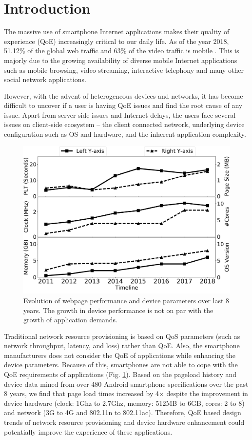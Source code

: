 \section{Introduction}
The massive use of smartphone Internet applications makes their quality of experience (QoE) increasingly critical to our daily life. 
As of the year 2018, 51.12\% of the global web traffic and 63\% of the video traffic is mobile \cite{statista2}. 
This is majorly due to the growing availability of diverse mobile Internet applications such as mobile browsing, video streaming, interactive telephony and many other social network applications.

However, with the advent of heterogeneous devices and networks, it has become difficult to uncover if a user is having QoE issues and find the root cause of any issue. 
Apart from server-side issues and Internet delays, the users face several issues on client-side ecosystem -- the client connected network, underlying device configuration such as OS and hardware, and the inherent application complexity.

\begin{figure}[t]
\centering
\includegraphics[width=0.85\linewidth]{sections/evolv}
\vspace{-0.3cm}
\caption{Evolution of webpage performance and device parameters over last 8 years. The growth in device performance is not on par with the growth of application demands.}
\label{fig:evolv}
\vspace{-0.6cm}
\end{figure}

Traditional network resource provisioning is based on QoS parameters (such as network throughput, latency, and loss) rather than QoE. 
Also, the smartphone manufacturers does not consider the QoE of applications while enhancing the device parameters.
Because of this, smartphones are not able to cope with the QoE requirements of applications (Fig. \ref{fig:evolv}).
Based on the pageload history \cite{htarch} and device data mined from over 480 Android smartphone specifications over the past 8 years, we find that page load times increased by 4$\times$ despite the improvement in device hardware (clock: 1Ghz to 2.7Ghz, memory: 512MB to 6GB, cores: 2 to 8) and network (3G to 4G and 802.11n to 802.11ac).
Therefore, QoE based design trends of network resource provisioning and device hardware enhancement could potentially improve the experience of these applications.

